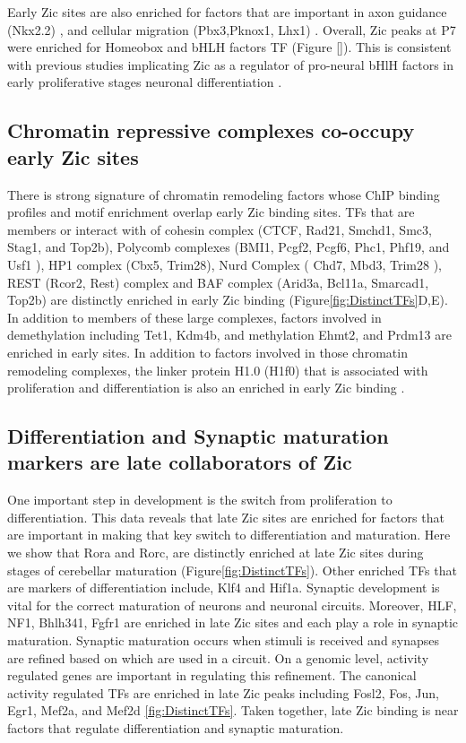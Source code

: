 \documentclass[fleqn,10pt,twocolumn]{wlscirep}
\begin{document}
Early Zic sites are also enriched for factors that are important in axon guidance (Nkx2.2) \cite{}, and cellular migration (Pbx3,Pknox1, Lhx1) \cite{}. Overall, Zic peaks at P7 were enriched for Homeobox and bHLH factors TF (Figure \ref{}). This is consistent with previous studies implicating Zic as a regulator of pro-neural bHlH factors in early proliferative stages neuronal differentiation \cite{Aruga2018ZicDisease}.

\subsection*{Chromatin repressive complexes co-occupy early Zic sites}
There is strong signature of chromatin remodeling factors whose ChIP binding profiles and motif enrichment overlap early Zic binding sites. TFs that are members or interact with of cohesin complex  (CTCF, Rad21, Smchd1, Smc3, Stag1, and Top2b), Polycomb  complexes (BMI1, Pcgf2, Pcgf6, Phc1, Phf19, and Usf1 ), HP1 complex (Cbx5, Trim28), Nurd Complex ( Chd7, Mbd3, Trim28 ), REST (Rcor2, Rest) complex and BAF complex (Arid3a, Bcl11a, Smarcad1, Top2b) are distinctly enriched in early Zic binding (Figure\ref{fig:DistinctTFs}D,E). In addition to members of these large complexes, factors involved in demethylation including Tet1, Kdm4b, and methylation Ehmt2, and Prdm13 are enriched in early sites. In addition to factors involved in those chromatin remodeling complexes, the linker protein H1.0 (H1f0) that is associated with proliferation and differentiation is also an enriched in early Zic binding \cite{DiLiegro2018H1.0Differentiation}. 

\subsection*{Differentiation and Synaptic maturation markers are late collaborators of Zic}
One important step in development is the switch from proliferation to differentiation. This data reveals that late Zic sites are enriched for factors that are important in making that key switch to differentiation and maturation. Here we show that Rora and Rorc, are distinctly enriched at late Zic sites during stages of cerebellar maturation (Figure\ref{fig:DistinctTFs}). Other enriched TFs that are markers of differentiation include, Klf4 and Hif1a. Synaptic development is vital for the correct maturation of neurons and neuronal circuits. Moreover, HLF, NF1, Bhlh341, Fgfr1 are enriched in late Zic sites and each play a role in synaptic maturation. Synaptic maturation occurs when stimuli is received and synapses are refined based on which are used in a circuit. On a genomic level, activity regulated genes are important in regulating this refinement. The canonical activity regulated TFs are enriched in late Zic peaks including Fosl2, Fos, Jun, Egr1, Mef2a, and Mef2d \ref{fig:DistinctTFs}. Taken together, late Zic binding is near factors that regulate differentiation and synaptic maturation. 
\end{document}
